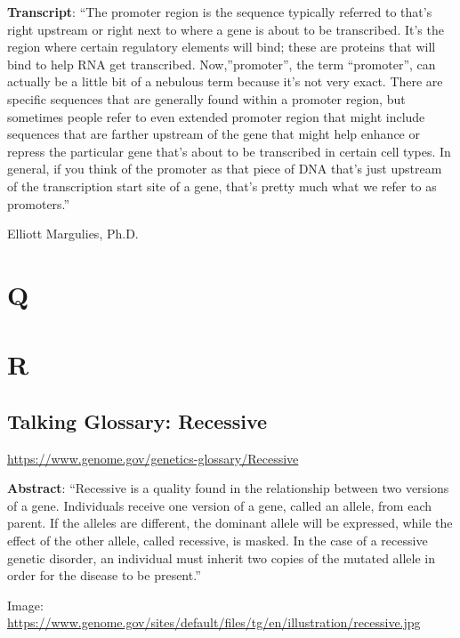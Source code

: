 \documentclass[
]{book}
\begin{document}
\textbf{Transcript}: ``The promoter region is the sequence typically referred to that's right upstream or right next to where a gene is about to be transcribed. It's the region where certain regulatory elements will bind; these are proteins that will bind to help RNA get transcribed. Now,''promoter'', the term ``promoter'', can actually be a little bit of a nebulous term because it's not very exact. There are specific sequences that are generally found within a promoter region, but sometimes people refer to even extended promoter region that might include sequences that are farther upstream of the gene that might help enhance or repress the particular gene that's about to be transcribed in certain cell types. In general, if you think of the promoter as that piece of DNA that's just upstream of the transcription start site of a gene, that's pretty much what we refer to as promoters.''

Elliott Margulies, Ph.D.

\hypertarget{q}{%
\chapter{Q}\label{q}}

\hypertarget{r}{%
\chapter{R}\label{r}}

\hypertarget{talking-glossary-recessive}{%
\section{Talking Glossary: Recessive}\label{talking-glossary-recessive}}

\url{https://www.genome.gov/genetics-glossary/Recessive}

\textbf{Abstract}: ``Recessive is a quality found in the relationship between two versions of a gene. Individuals receive one version of a gene, called an allele, from each parent. If the alleles are different, the dominant allele will be expressed, while the effect of the other allele, called recessive, is masked. In the case of a recessive genetic disorder, an individual must inherit two copies of the mutated allele in order for the disease to be present.''

Image: \url{https://www.genome.gov/sites/default/files/tg/en/illustration/recessive.jpg}
\end{document}
